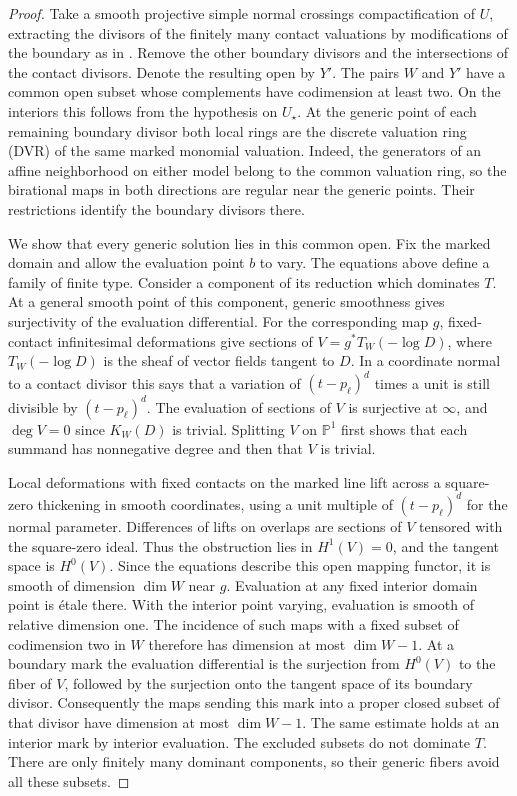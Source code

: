 \documentclass[11pt,reqno]{amsart}
\numberwithin{equation}{section}
\theoremstyle{definition}
\theoremstyle{remark}
\begin{document}
\begin{proof}
Take a smooth projective simple normal crossings compactification
of \(U\), extracting the divisors of the finitely many contact
valuations by modifications of the boundary as in
\cite[\S1, definition of the Frobenius multilinear form]{KY}.
Remove the other boundary divisors and the intersections of the contact divisors. Denote the resulting open by \(Y'\).
The pairs \(W\) and \(Y'\) have a common open subset whose complements
have codimension at least two. On the interiors this follows from
the hypothesis on \(U_\star\). At the generic point of each remaining
boundary divisor both local rings are the discrete valuation ring (DVR)
of the same marked monomial valuation. Indeed, the generators of an affine neighborhood on either model
belong to the common valuation ring, so the birational maps in both
directions are regular near the generic points. Their restrictions
identify the boundary divisors there.

We show that every generic solution lies in this common open.
Fix the marked domain and allow the evaluation point \(b\) to vary.
The equations above define a family of finite type. Consider a
component of its reduction which dominates \(T\). At a general
smooth point of this component, generic smoothness gives surjectivity
of the evaluation differential. For the corresponding map \(g\),
fixed-contact infinitesimal deformations give sections of
\(V=g^*T_W(-\log D)\), where \(T_W(-\log D)\) is the sheaf of vector
fields tangent to \(D\). In a coordinate normal to a contact divisor
this says that a variation of \((t-p_\ell)^d\) times a unit is still
divisible by \((t-p_\ell)^d\). The evaluation of sections of \(V\)
is surjective at \(\infty\), and \(\deg V=0\) since \(K_W(D)\)
is trivial. Splitting \(V\) on \(\mathbb P^1\) first shows that
each summand has nonnegative degree and then that \(V\) is trivial.

Local deformations with fixed contacts on the marked line lift across a square-zero thickening in smooth coordinates,
using a unit multiple of \((t-p_\ell)^d\) for the normal parameter.
Differences of lifts on overlaps are sections of \(V\) tensored with
the square-zero ideal. Thus the obstruction lies in \(H^1(V)=0\),
and the tangent space is \(H^0(V)\). Since the equations describe
this open mapping functor, it is smooth of dimension \(\dim W\)
near \(g\). Evaluation at any fixed interior domain point is
\'{e}tale there. With the interior point varying, evaluation is
smooth of relative dimension one. The incidence of such maps with
a fixed subset of codimension two in \(W\) therefore has dimension
at most \(\dim W-1\). At a boundary mark the evaluation differential
is the surjection from \(H^0(V)\) to the fiber of \(V\), followed by
the surjection onto the tangent space of its boundary divisor.
Consequently the maps sending this mark into a proper closed subset
of that divisor have dimension at most \(\dim W-1\). The same
estimate holds at an interior mark by interior evaluation.
The excluded subsets do not dominate \(T\). There are only finitely many dominant components, so their generic fibers avoid all these subsets.


\end{proof}
\end{document}
